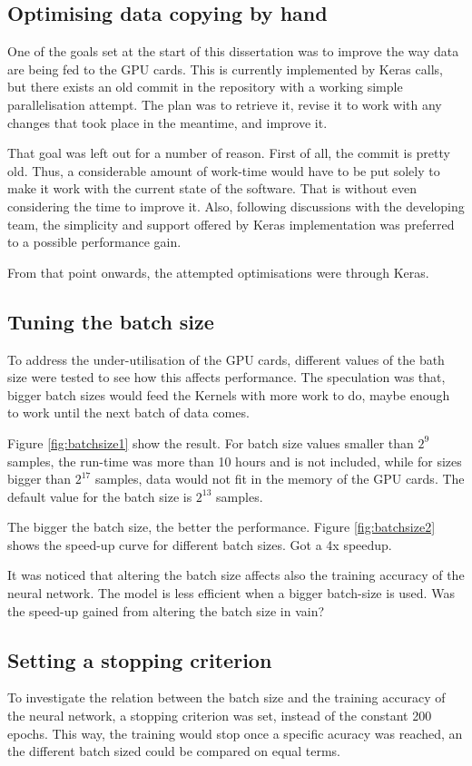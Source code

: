 \subsection{Optimising data copying by hand}
 One of the goals set at the start of this dissertation was to improve the way data are being fed to the GPU cards. This is currently implemented by Keras calls, but there exists an old commit in the repository with a working simple parallelisation attempt. The plan was to retrieve it, revise it to work with any changes that took place in the meantime, and improve it.
 
That goal was left out for a number of reason. First of all, the commit is pretty old. Thus, a considerable amount of work-time would have to be put solely to make it work with the current state of the software. That is without even considering the time to improve it. Also, following discussions with the developing team, the simplicity and support offered by Keras implementation was preferred to a possible performance gain.

From that point onwards, the attempted optimisations were through Keras.  

\subsection{Tuning the batch size}
To address the under-utilisation of the GPU cards, different values of the bath size were tested to see how this affects performance. The speculation was that, bigger batch sizes would feed the Kernels with more work to do, maybe enough to work until the next batch of data comes.

Figure \ref{fig:batchsize1} show the result. For batch size values smaller than $2^9$ samples, the run-time was more than 10 hours and is not included, while for sizes bigger than $2^{17}$ samples, data would not fit in the memory of the GPU cards. The default value for the batch size is $2^{13}$ samples.

The bigger the batch size, the better the performance. Figure \ref{fig:batchsize2} shows the speed-up curve for different batch sizes. Got a 4x speedup.

It was noticed that altering the batch size affects also the training accuracy of the neural network. The model is less efficient when a bigger batch-size is used. Was the speed-up gained from altering the batch size in vain?


\subsection{Setting a stopping criterion} 
To investigate the relation between the batch size and the training accuracy of the neural network, a stopping criterion was set, instead of the constant 200 epochs. This way, the training would stop once a specific acuracy was reached, an the different batch sized could be compared  on equal terms.

